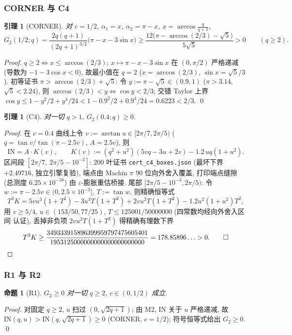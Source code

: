 \documentclass[UTF8]{ctexart}
\newtheorem{proposition}[theorem]{命题}
\newtheorem{lemma}[theorem]{引理}
\begin{document}
\subsubsection{CORNER 与 C4}
\begin{lemma}[CORNER]
对 $c=1/2$, $\alpha_1=x$, $\alpha_2=\pi-x$, $x=\arccos\frac q{q+1}$,
\begin{equation}
	G_2(1/2;q)=\frac{2q(q+1)}{(2q+1)^{3/2}}\bigl(\pi-x-3\sin x\bigr)
	\ge\frac{12\bigl(\pi-\arccos(2/3)-\sqrt5\bigr)}{5\sqrt5}>0\qquad(q\ge2).
\end{equation}
\end{lemma}
\begin{proof}
$q\ge2\iff x\le\arccos(2/3)$; $x\mapsto\pi-x-3\sin x$ 在 $(0,\pi/2)$ 严格递减
(导数为 $-1-3\cos x<0$), 故最小值在 $q=2$ ($x=\arccos(2/3)$, $\sin x=\sqrt5/3$).
初等证书 $\pi>\arccos(2/3)+\sqrt5$: 令 $y:=\pi-\sqrt5\in(0.9,1)$ ($\pi>3.14$,
$\sqrt5<2.24$), 则 $\arccos(2/3)<y\iff\cos y<2/3$; 交错 Taylor 上界
$\cos y\le1-y^2/2+y^4/24<1-0.9^2/2+0.9^4/24=0.6223<2/3$. \qed
\end{proof}

\begin{lemma}[C4]
对一切 $q>1$, $G_2(0.4;q)\ge0$.
\end{lemma}
\begin{proof}
在 $c=0.4$ 曲线上令 $v:=\arctan u\in[2\pi/7,2\pi/5)$
($q=\tan v/\tan(\pi-2.5v)$, $A=2.5v$), 则
\begin{equation}
	\mathrm{IN}=A\cdot K(v),\qquad
	K(v):=(q^2+u^2)(5vq-3u+2v)-1.2\,uq(1+u^2).
\end{equation}
区间段 $[2\pi/7,\ 2\pi/5-10^{-3}]$: 200 叶证书 \texttt{cert\_c4\_boxes.json}
(最坏下界 $+2.49716$, 独立引擎复验), 端点由 Machin $\pi$ 90 位向外舍入覆盖,
打印端点缝隙 (总测度 $6.25\times10^{-58}$) 由 $\varepsilon$-膨胀重估桥接.
尾部 $[2\pi/5-10^{-3},2\pi/5)$: 令 $w:=\pi-2.5v\in(0,2.5\times10^{-3}]$, $T:=\tan w$,
则精确恒等式
\begin{equation}
	T^3K=5vu^3(1+T^2)-3u^3T(1+T^2)+2vu^2T(1+T^2)-1.2u^2(1+u^2)T^2,
\end{equation}
用 $v\ge5/4$, $u\in(153/50,77/25)$, $T\le125001/50000000$ (四常数均经向外舍入区间
认证), 丢掉非负项 $2vu^2T(1+T^2)$ 得精确有理数下界
\begin{equation}
	T^3K\ge\frac{349333915896399959797475605401}{1953125000000000000000000000}
	=178.85896\ldots>0.\qed
\end{equation}
\end{proof}

\subsubsection{R1 与 R2}
\begin{proposition}[R1]
$G_2\ge0$ 对一切 $q\ge2$, $c\in(0,1/2)$ 成立.
\end{proposition}
\begin{proof}
对固定 $q\ge2$, $u$ 扫过 $(0,\sqrt{2q+1})$; 由 M2, $\mathrm{IN}$ 关于 $u$ 严格递减,
故 $\mathrm{IN}(q,u)>\mathrm{IN}(q,\sqrt{2q+1})\ge0$ (CORNER, $c=1/2$); 符号恒等式给出
$G_2\ge0$. \qed
\end{proof}
\end{document}
